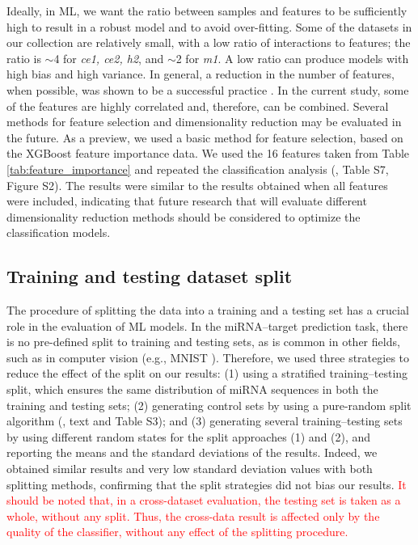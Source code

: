 \documentclass{bmcart}
\begin{document}
Ideally, in ML, we want the ratio between samples and features to be sufficiently high to result in a robust model and to avoid over-fitting. Some of the datasets in our collection are relatively small, with a low ratio of interactions to features; the ratio is $\sim$4 for \textit{ce1, ce2, h2}, and $\sim$2 for \textit{m1}. A low ratio can produce models with high bias and high variance. In general, a reduction in the number of features, when possible, was shown to be a successful practice \cite{blum1997selection}. In the current study, some of the features are highly correlated and, therefore, can be combined. Several methods for feature selection and dimensionality reduction may be evaluated in the future. As a preview, we used a basic method for feature selection, based on the XGBoost feature importance data. We used the 16 features taken from Table \ref{tab:feature_importance} and repeated the classification analysis (, Table S7, Figure S2). The results were similar to the results obtained when all features were included, indicating that future research that will evaluate different dimensionality reduction methods should be considered to optimize the classification models. 

\subsection*{Training and testing dataset split} 
The procedure of splitting the data into a training and a testing set has a crucial role in the evaluation of ML models. In the miRNA--target prediction task, there is no pre-defined split to training and testing sets, as is common in other fields, such as in computer vision (e.g., MNIST \cite{mnist10027939599}). Therefore, we used three strategies to reduce the effect of the split on our results: (1) using a stratified training--testing split, which ensures the same distribution of miRNA sequences in both the training and testing sets; (2) generating control sets by using a pure-random split algorithm (, text and Table S3); and (3) generating several training--testing sets by using different random states for the split approaches (1) and (2),  and reporting the means and the standard deviations of the results. Indeed, we obtained similar results and very low standard deviation values with both splitting methods, confirming that the split strategies did not bias our results.
\textcolor{red}{It should be noted that, in a cross-dataset evaluation, the testing set is taken as a whole, without any split. Thus, the cross-data result is affected only by the quality of the classifier, without any effect of the splitting procedure.}
\end{document}
